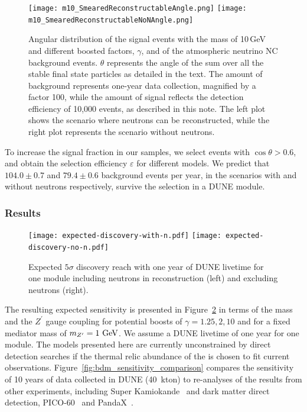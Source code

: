 \begin{figure}[!htb]
\centering
\texttt{[image: m10\_SmearedReconstructableAngle.png]}
\texttt{[image: m10\_SmearedReconstructableNoNAngle.png]}
\caption[Angular distribution of the BDM signal events with the BDM mass of 10\,GeV]{Angular distribution of the  signal events with the  mass of 10\,GeV
and different boosted factors, $\gamma$, and of the atmospheric neutrino NC
background events.
$\theta$ represents the angle of the sum over all the stable final state
particles as detailed in the text.
The amount of background represents one-year data collection, magnified by a factor 100,
while the amount of signal reflects the detection efficiency of 10,000  events, as
described in this note.
The left plot shows the scenario where neutrons can be reconstructed,
while the right plot represents the scenario without neutrons.}
\label{fig:m10_SmearedReconstructableAngle}
\end{figure}


To increase the signal fraction in our samples, we select events with $\cos\theta > 0.6$,
and obtain the selection efficiency $\varepsilon$ for different  models.
We predict that $104.0 \pm 0.7$ and $79.4 \pm 0.6$ background events per year, in the scenarios with and without neutrons respectively, survive the selection in a DUNE \nominalmodsize module.

\subsubsection{Results}

\begin{figure}[!htb]
\centering
\texttt{[image: expected-discovery-with-n.pdf]}\hspace{0.05\textwidth}
\texttt{[image: expected-discovery-no-n.pdf]}
\caption[Expected $5\sigma$ discovery reach with one year of DUNE livetime]{Expected $5\sigma$ discovery reach with one year of DUNE livetime for one \nominalmodsize module including neutrons in reconstruction (left) and excluding neutrons (right).\label{fig:significance}}
\end{figure}
The resulting expected sensitivity is presented in Figure~\ref{fig:significance} in terms of the  mass and the $Z^\prime$ gauge coupling for potential  boosts of $\gamma = 1.25,2,10$ and for a fixed mediator mass of $m_{Z^\prime} = 1~{\rm GeV}$.  We assume a DUNE livetime of one year for one \nominalmodsize module.  The models presented here are currently unconstrained by direct detection searches if the thermal relic abundance of the  is chosen to fit current observations.
Figure~\ref{fig:bdm_sensitivity_comparison} compares the sensitivity of 10 years of data collected in DUNE (40~kton) to re-analyses of the results from other experiments, including Super Kamiokande~\cite{Fechner:2009aa} and dark matter direct detection, PICO-60~\cite{Amole:2019fdf} and PandaX~\cite{Xia:2018qgs}. 

